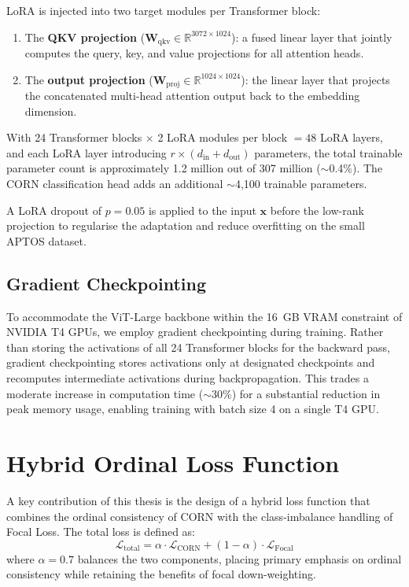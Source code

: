 LoRA is injected into two target modules per Transformer block:
\begin{enumerate}
    \item The \textbf{QKV projection} ($\mathbf{W}_{\text{qkv}} \in \mathbb{R}^{3072 \times 1024}$): a fused linear layer that jointly computes the query, key, and value projections for all attention heads.
    \item The \textbf{output projection} ($\mathbf{W}_{\text{proj}} \in \mathbb{R}^{1024 \times 1024}$): the linear layer that projects the concatenated multi-head attention output back to the embedding dimension.
\end{enumerate}

With 24 Transformer blocks $\times$ 2 LoRA modules per block $= 48$ LoRA layers, and each LoRA layer introducing $r \times (d_{\text{in}} + d_{\text{out}})$ parameters, the total trainable parameter count is approximately 1.2 million out of 307 million ($\sim$0.4\%). The CORN classification head adds an additional $\sim$4,100 trainable parameters.

A LoRA dropout of $p = 0.05$ is applied to the input $\mathbf{x}$ before the low-rank projection to regularise the adaptation and reduce overfitting on the small APTOS dataset.

\subsection{Gradient Checkpointing}

To accommodate the ViT-Large backbone within the 16~GB VRAM constraint of NVIDIA T4 GPUs, we employ gradient checkpointing \cite{chen2016training} during training. Rather than storing the activations of all 24 Transformer blocks for the backward pass, gradient checkpointing stores activations only at designated checkpoints and recomputes intermediate activations during backpropagation. This trades a moderate increase in computation time ($\sim$30\%) for a substantial reduction in peak memory usage, enabling training with batch size 4 on a single T4 GPU.

\section{Hybrid Ordinal Loss Function}
\label{sec:loss_function}

A key contribution of this thesis is the design of a hybrid loss function that combines the ordinal consistency of CORN with the class-imbalance handling of Focal Loss. The total loss is defined as:
\begin{equation}
    \mathcal{L}_{\text{total}} = \alpha \cdot \mathcal{L}_{\text{CORN}} + (1 - \alpha) \cdot \mathcal{L}_{\text{Focal}}
    \label{eq:hybrid_loss}
\end{equation}
where $\alpha = 0.7$ balances the two components, placing primary emphasis on ordinal consistency while retaining the benefits of focal down-weighting.

